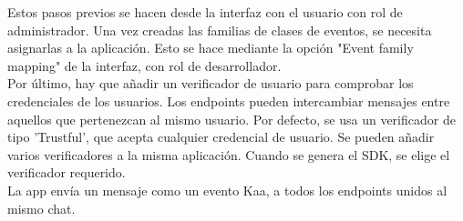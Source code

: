 \documentclass[12pt, twoside]{book}
\begin{document}
Estos pasos previos se hacen desde la interfaz con el usuario con rol de administrador. Una vez creadas las familias de clases de eventos, se necesita asignarlas a la aplicación. Esto se hace mediante la opción "Event family mapping" de la interfaz, con rol de desarrollador. \\
Por último, hay que añadir 	un verificador de usuario para comprobar los credenciales de los usuarios. Los endpoints pueden intercambiar mensajes entre aquellos que pertenezcan al mismo usuario. Por defecto, se usa un verificador de tipo 'Trustful', que acepta cualquier credencial de usuario. Se pueden añadir varios verificadores a la misma aplicación. Cuando se genera el SDK, se elige el verificador requerido. \\
La app envía un mensaje como un evento Kaa, a todos los endpoints unidos al mismo chat.
\end{document}
